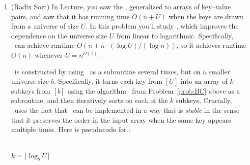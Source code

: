 \documentclass[11pt]{article}
\begin{document}
\begin{enumerate}
\begin{enumerate}
\item Let $\Pi'=(\Inputs,\Outputs,f')$ be the problem with the same $\Inputs$ and $\Outputs$ as $\Pi$, but $f'(n,b,k) = f(n,b,k) \cup \{(0,1, \ldots,k-1)\}$. Does every algorithm $A$ that solves $\Pi$ also solve $\Pi'$? (Hint: any differences between inputs that were relevant in the previous subproblem are worth considering here.) Justify your answer with a proof or a counterexample.

\vspace{0.5em}
\noindent\textbf{Answer.} Since $|f'(n,b,k)|\geq 1$ because of the union, $A$ solves $\Pi$ does not mean $A$ solves $\Pi'$. For example, $\BC(2,2,1)$ returns $\bot$, which is invalid since $f'(2,2,1)\neq\emptyset$.

\end{enumerate}
\newpage

\item (Radix Sort) In Lecture, you saw the \SingletonBucketSort, generalized to arrays of key--value pairs, and saw that it has running time $O(n+U)$ when the keys are drawn from a universe of size $U$. In this problem you'll study {\em \RadixSort}, which improves the dependence on the universe size $U$ from linear to logarithmic.  Specifically, \RadixSort\ can achieve runtime $O(n+n\cdot (\log U)/(\log n))$, so it achieves runtime $O(n)$ whenever $U = n^{O(1)}$.

\RadixSort\ is constructed by using \SingletonBucketSort\ as a subroutine several times, but on a smaller universe size $b$.  Specifically, it turns each key from $[U]$ into an array of $k$ subkeys from $[b]$ using the algorithm \BC\ from Problem~\ref{prob:BC} above as a subroutine, and then iteratively sorts on each of the $k$ subkeys,
Crucially, \RadixSort\ uses the fact that \SingletonBucketSort\ can be implemented in a way that is {\em stable} in the sense that it preserves the order in the input array when the same key appears multiple times.  Here is pseudocode for \RadixSort:


\begin{algorithm}[H]
\\
$k=\lceil \log_b U\rceil$\;
\caption{Radix Sort}
\end{algorithm}


\end{enumerate}
\end{document}

